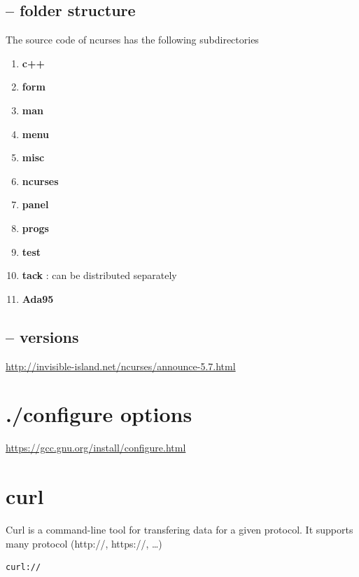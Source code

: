 \subsection{-- folder structure}

The source code of ncurses has the following subdirectories
\begin{enumerate}
  \item {\bf c++}
  
  \item {\bf form}
  
  \item {\bf man}
  
  \item {\bf menu}
  
  \item {\bf misc}
  
  \item {\bf ncurses}
  
  \item {\bf panel}
  
  \item {\bf progs}
  
  \item {\bf test}
  
  \item {\bf tack} : can be distributed separately
  
  \item {\bf Ada95}
\end{enumerate}


\subsection{-- versions}

\url{http://invisible-island.net/ncurses/announce-5.7.html}
\section{./configure options}

\url{https://gcc.gnu.org/install/configure.html}

\section{curl}
\label{sec:curl}

Curl is a command-line tool for transfering data for a given protocol.
It supports many protocol (http://, https://, \ldots)
\begin{verbatim}
curl://
\end{verbatim}




